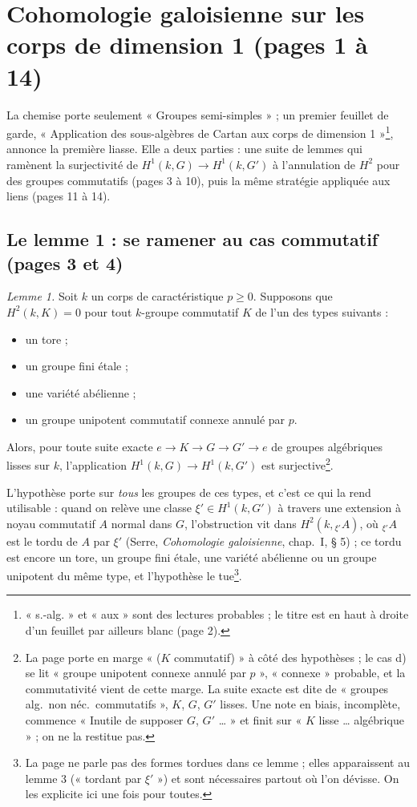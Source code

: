 \documentclass[11pt,a4paper]{article}
\begin{document}
\section*{Cohomologie galoisienne sur les corps de dimension 1 (pages 1 à 14)}

La chemise porte seulement « Groupes semi-simples » ; un premier feuillet de
garde, « Application des sous-algèbres de Cartan aux corps de
dimension 1 »\footnote{« s.-alg. » et « aux » sont des lectures probables ; le
titre est en haut à droite d'un feuillet par ailleurs blanc (page 2).}, annonce
la première liasse. Elle a deux parties : une suite de lemmes qui ramènent la
surjectivité de $H^1(k,G) \to H^1(k,G')$ à l'annulation de $H^2$ pour des groupes
commutatifs (pages 3 à 10), puis la même stratégie appliquée aux liens
(pages 11 à 14).

\subsection*{Le lemme 1 : se ramener au cas commutatif (pages 3 et 4)}

\emph{Lemme 1.} Soit $k$ un corps de caractéristique $p \geq 0$. Supposons que
$H^2(k,K) = 0$ pour tout $k$-groupe commutatif $K$ de l'un des types suivants :
\begin{itemize}
\item[a)] un tore ;
\item[b)] un groupe fini étale ;
\item[c)] une variété abélienne ;
\item[d)] un groupe unipotent commutatif connexe annulé par $p$.
\end{itemize}
Alors, pour toute suite exacte $e \to K \to G \to G' \to e$ de groupes
algébriques lisses sur $k$, l'application $H^1(k,G) \to H^1(k,G')$ est
surjective\footnote{La page porte en marge « ($K$ commutatif) » à côté des
hypothèses ; le cas d) se lit « groupe unipotent connexe annulé par $p$ »,
« connexe » probable, et la commutativité vient de cette marge. La suite exacte
est dite de « groupes alg.\ non néc.\ commutatifs », $K$, $G$, $G'$ lisses. Une
note en biais, incomplète, commence « Inutile de supposer $G$, $G'$ … » et finit
sur « $K$ lisse … algébrique » ; on ne la restitue pas.}.

L'hypothèse porte sur \emph{tous} les groupes de ces types, et c'est ce qui la
rend utilisable : quand on relève une classe $\xi' \in H^1(k,G')$ à travers
une extension à noyau commutatif $A$ normal dans $G$, l'obstruction vit dans
$H^2(k, {}_{\xi'}A)$, où ${}_{\xi'}A$ est le tordu de $A$ par $\xi'$ (Serre,
\emph{Cohomologie galoisienne}, chap.~I, § 5) ; ce tordu est encore un tore,
un groupe fini étale, une variété abélienne ou un groupe unipotent du même
type, et l'hypothèse le tue\footnote{La page ne parle pas des formes tordues
dans ce lemme ; elles apparaissent au lemme 3 (« tordant par $\xi'$ ») et sont
nécessaires partout où l'on dévisse. On les explicite ici une
fois pour toutes.}.
\end{document}
